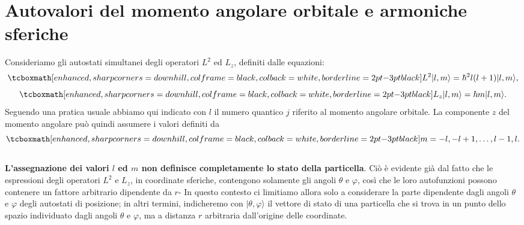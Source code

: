 \section[Autovalori del momento angolare orbitale e armoniche sferiche]{Autovalori del momento angolare orbitale e armoniche sferiche}
Consideriamo gli autostati simultanei degli operatori $L^2$ ed $L_z$, definiti dalle equazioni:
	\begin{equation}
		 \tcboxmath[enhanced, sharp corners=downhill, colframe=black, colback=white, borderline={2pt}{-3pt}{black}]{
			L^2 \vert l, m \rangle = \hbar ^2 l(l+1) \vert l, m \rangle ,\label{eq:cap17_6}
		}
	\end{equation}
	\begin{equation}
		\tcboxmath[enhanced, sharp corners=downhill, colframe=black, colback=white, borderline={2pt}{-3pt}{black}]{
L_z \vert l, m \rangle = \hbar m \vert l, m \rangle
\label{eq:cap17_7}.
		}
	\end{equation}
Seguendo una pratica usuale abbiamo qui indicato con $l$ il numero quantico $j$ riferito al momento angolare orbitale. La componente $z$ del momento angolare può quindi assumere i valori definiti da
	\begin{equation}
		\tcboxmath[enhanced, sharp corners=downhill, colframe=black, colback=white, borderline={2pt}{-3pt}{black}]{
			m = -l, -l+1, \dots,l-1, l .
			}
	\end{equation}\\

\textbf{L'assegnazione dei valori $l$ ed $m$ non definisce completamente lo stato della particella}. Ciò è evidente già dal fatto che le espressioni degli operatori $L^2$ e $L_z$, in coordinate sferiche, contengono solamente gli angoli $\theta$ e $\varphi$, così che le loro autofunzioni possono contenere un fattore arbitrario dipendente da $r$- In questo contesto ci limitiamo allora solo a considerare la parte dipendente dagli angoli $\theta$ e $\varphi$ degli autostati di posizione; in altri termini, indicheremo con $\vert \theta ,\varphi\rangle$ il vettore di stato di una particella che si trova in un punto dello spazio individuato dagli angoli $\theta $ e $\varphi$, ma a distanza $r$ arbitraria dall'origine delle coordinate.\\

